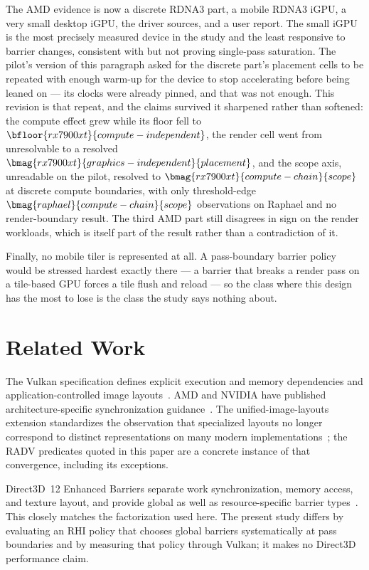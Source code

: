 \documentclass[10pt,twocolumn]{article}
\begin{document}
The AMD evidence is now a discrete RDNA3 part, a mobile RDNA3 iGPU, a very
small desktop iGPU, the driver sources, and a user report. The small iGPU is
the most precisely measured device in the study and the least responsive to
barrier changes, consistent with but not proving single-pass saturation. The pilot's version of this paragraph
asked for the discrete part's placement cells to be repeated with enough
warm-up for the device to stop accelerating before being leaned on --- its
clocks were already pinned, and that was not enough. This revision is that
repeat, and the claims survived it sharpened rather than softened: the compute
effect grew while its floor fell to $\bfloor{rx7900xt}{compute-independent}$,
the render cell went from unresolvable to a resolved
$\bmag{rx7900xt}{graphics-independent}{placement}$, and the scope axis,
unreadable on the pilot, resolved to $\bmag{rx7900xt}{compute-chain}{scope}$
at discrete compute boundaries, with only threshold-edge
$\bmag{raphael}{compute-chain}{scope}$ observations on Raphael and no
render-boundary result. The third AMD part still disagrees in
sign on the render workloads, which is itself part of the result rather than a
contradiction of it.

Finally, no mobile tiler is represented at all. A pass-boundary barrier
policy would be stressed hardest exactly there --- a barrier that breaks a
render pass on a tile-based GPU forces a tile flush and reload --- so the
class where this design has the most to lose is the class the study says
nothing about.

\section{Related Work}

The Vulkan specification defines explicit execution and memory dependencies
and application-controlled image layouts~\cite{vulkan-spec}. AMD and NVIDIA
have published architecture-specific synchronization
guidance~\cite{amd-barriers,amd-rdna-guide,nvidia-vulkan-tips}. The
unified-image-layouts extension standardizes the observation that specialized
layouts no longer correspond to distinct representations on many modern
implementations~\cite{vulkan-unified-layouts}; the RADV predicates quoted in
this paper are a concrete instance of that convergence, including its
exceptions.

Direct3D~12 Enhanced Barriers separate work synchronization, memory access,
and texture layout, and provide global as well as resource-specific barrier
types~\cite{d3d12-enhanced-barriers}. This closely matches the factorization
used here. The present study differs by evaluating an RHI policy that chooses
global barriers systematically at pass boundaries and by measuring that policy
through Vulkan; it makes no Direct3D performance claim.
\end{document}
